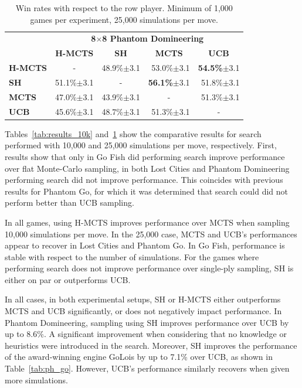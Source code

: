 \documentclass[a4paper]{llncs}
\begin{document}
\begin{table}[ht]
\begin{tabular}{@{}lrrrr@{}}
\toprule
& \multicolumn{4}{c}{\textbf{8$\times$8 Phantom Domineering}}       \\
& \multicolumn{1}{c}{\textbf{H-MCTS}} & \multicolumn{1}{c}{\textbf{SH}} & \multicolumn{1}{c}{\textbf{MCTS}} & \multicolumn{1}{c}{\textbf{UCB}} \\ [1mm] \cmidrule(l){2-5} 
\textbf{H-MCTS} & \multicolumn{1}{c}{-}		& 48.9\%$\pm$3.1			& 53.0\%$\pm$3.1 			& \textbf{54.5\%}$\pm$3.1 		\\[.5mm] 
\textbf{SH}     & 51.1\%$\pm$3.1			& \multicolumn{1}{c}{-}		& \textbf{56.1\%}$\pm$3.1	& 51.8\%$\pm$3.1		 		\\[.5mm] 
\textbf{MCTS}   & 47.0\%$\pm$3.1			& 43.9\%$\pm$3.1			& \multicolumn{1}{c}{-} 	& 51.3\%$\pm$3.1  				\\[.5mm] 
\textbf{UCB}	& 45.6\%$\pm$3.1			& 48.7\%$\pm$3.1			& 51.3\%$\pm$3.1			& \multicolumn{1}{c}{-} 		\\[.5mm] \bottomrule
\end{tabular}

\vspace{2mm}
{\caption{Win rates with respect to the row player. Minimum of 1,000 games per experiment, 25,000 simulations per move.} \label{tab:results_25k}}
\end{table}

Tables~\ref{tab:results_10k} and~\ref{tab:results_25k} show the comparative results for search performed with 10,000 and 25,000 simulations per move, respectively. First, results show that only in Go Fish did performing search improve performance over flat Monte-Carlo sampling, in both Lost Cities and Phantom Domineering performing search did not improve performance. This coincides with previous results for Phantom Go, for which it was determined that search could did not perform better than UCB sampling. 

In all games, using H-MCTS improves performance over MCTS when sampling 10,000 simulations per move. In the 25,000 case, MCTS and UCB's performances appear to recover in Lost Cities and Phantom Go. In Go Fish, performance is stable with respect to the number of simulations. For the games where performing search does not improve performance over single-ply sampling, SH is either on par or outperforms UCB.

In all cases, in both experimental setups, SH or H-MCTS either outperforms MCTS and UCB significantly, or does not negatively impact performance. In Phantom Domineering, sampling using SH improves performance over UCB by up to 8.6\%. A significant improvement when considering that no knowledge or heuristics were introduced in the search. Moreover, SH improves the performance of the award-winning engine {\sc GoLois} by up to 7.1\% over UCB, as shown in Table~\ref{tab:ph_go}. However, UCB's performance similarly recovers when given more simulations.
\end{document}
